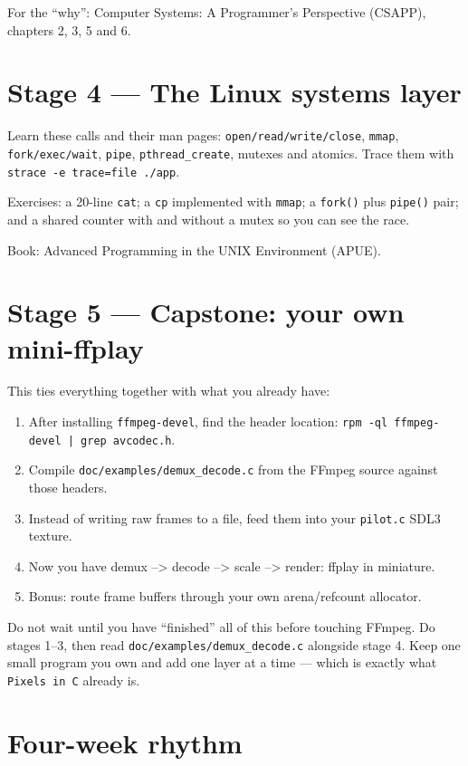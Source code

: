 \documentclass[11pt]{article}
\begin{document}
For the ``why'': Computer Systems: A Programmer's Perspective (CSAPP),
chapters 2, 3, 5 and 6.

\section{Stage 4 --- The Linux systems layer}

Learn these calls and their man pages: \texttt{open/read/write/close},
\texttt{mmap}, \texttt{fork/exec/wait}, \texttt{pipe}, \verb|pthread_create|,
mutexes and atomics. Trace them with \texttt{strace -e trace=file ./app}.

Exercises: a 20-line \texttt{cat}; a \texttt{cp} implemented with \texttt{mmap};
a \texttt{fork()} plus \texttt{pipe()} pair; and a shared counter with and
without a mutex so you can see the race.

Book: Advanced Programming in the UNIX Environment (APUE).

\section{Stage 5 --- Capstone: your own mini-ffplay}

This ties everything together with what you already have:

\begin{enumerate}
  \item After installing \texttt{ffmpeg-devel}, find the header location:
        \texttt{rpm -ql ffmpeg-devel | grep avcodec.h}.
  \item Compile \verb|doc/examples/demux_decode.c| from the FFmpeg source
        against those headers.
  \item Instead of writing raw frames to a file, feed them into your
        \texttt{pilot.c} SDL3 texture.
  \item Now you have demux --> decode --> scale --> render: ffplay in
        miniature.
  \item Bonus: route frame buffers through your own arena/refcount allocator.
\end{enumerate}

Do not wait until you have ``finished'' all of this before touching FFmpeg.
Do stages 1--3, then read \verb|doc/examples/demux_decode.c| alongside
stage 4. Keep one small program you own and add one layer at a time --- which
is exactly what \texttt{Pixels in C} already is.

\section{Four-week rhythm}
\end{document}
